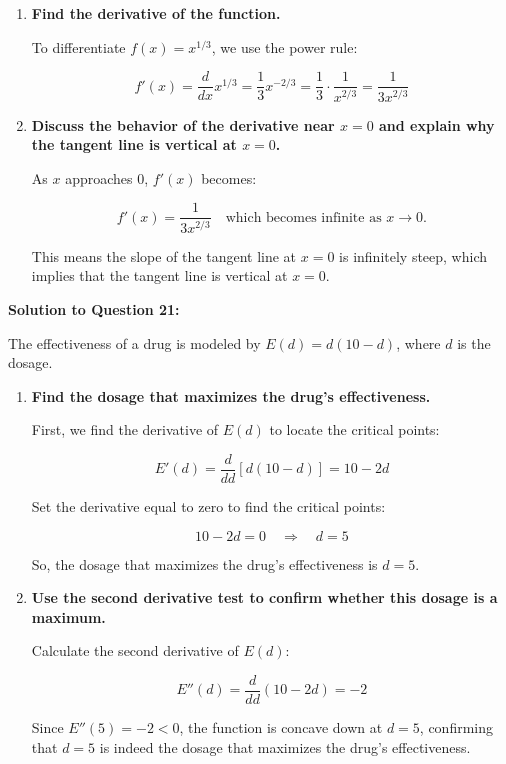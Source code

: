 \documentclass{article}
\begin{document}
    \begin{enumerate}[label=(\alph*), itemsep=10pt]
        \item \textbf{Find the derivative of the function.}

        To differentiate \( f(x) = x^{1/3} \), we use the power rule:

        \[
        f'(x) = \frac{d}{dx} x^{1/3} = \frac{1}{3}x^{-2/3} = \frac{1}{3} \cdot \frac{1}{x^{2/3}} = \frac{1}{3x^{2/3}}
        \]

        \item \textbf{Discuss the behavior of the derivative near \( x = 0 \) and explain why the tangent line is vertical at \( x = 0 \).}

        As \( x \) approaches 0, \( f'(x) \) becomes:

        \[
        f'(x) = \frac{1}{3x^{2/3}} \quad \text{which becomes infinite as } x \to 0.
        \]

        This means the slope of the tangent line at \( x = 0 \) is infinitely steep, which implies that the tangent line is vertical at \( x = 0 \).
    \end{enumerate}

    \item \textbf{Solution to Question 21:}

    The effectiveness of a drug is modeled by \( E(d) = d(10 - d) \), where \( d \) is the dosage.

    \begin{enumerate}[label=(\alph*), itemsep=10pt]
        \item \textbf{Find the dosage that maximizes the drug's effectiveness.}

        First, we find the derivative of \( E(d) \) to locate the critical points:

        \[
        E'(d) = \frac{d}{dd} \left[ d(10 - d) \right] = 10 - 2d
        \]

        Set the derivative equal to zero to find the critical points:

        \[
        10 - 2d = 0 \quad \Rightarrow \quad d = 5
        \]

        So, the dosage that maximizes the drug's effectiveness is \( d = 5 \).

        \item \textbf{Use the second derivative test to confirm whether this dosage is a maximum.}

        Calculate the second derivative of \( E(d) \):

        \[
        E''(d) = \frac{d}{dd} \left( 10 - 2d \right) = -2
        \]

        Since \( E''(5) = -2 < 0 \), the function is concave down at \( d = 5 \), confirming that \( d = 5 \) is indeed the dosage that maximizes the drug's effectiveness.
    \end{enumerate}
\end{document}
